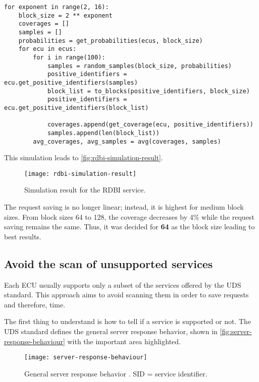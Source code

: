 \begin{samepage}
\begin{verbatim}
for exponent in range(2, 16):
    block_size = 2 ** exponent
    coverages = []
    samples = []
    probabilities = get_probabilities(ecus, block_size)
    for ecu in ecus:
        for i in range(100):
            samples = random_samples(block_size, probabilities)
            positive_identifiers = ecu.get_positive_identifiers(samples)
            block_list = to_blocks(positive_identifiers, block_size)
            positive_identifiers = ecu.get_positive_identifiers(block_list)

            coverages.append(get_coverage(ecu, positive_identifiers))
            samples.append(len(block_list))
        avg_coverages, avg_samples = avg(coverages, samples)
\end{verbatim}
\end{samepage}

This simulation leads to \autoref{fig:rdbi-simulation-result}.

\begin{figure}[h]
    \centering
    \texttt{[image: rdbi-simulation-result]}
    \caption{Simulation result for the RDBI service.}
    \label{fig:rdbi-simulation-result}
\end{figure}

The request saving is no longer linear; instead, it is highest for medium block sizes. From block sizes 64 to 128, the coverage decreases by 4\% while the request saving remains the same. Thus, it was decided for \textbf{64} as the block size leading to best results.


\subsection{Avoid the scan of unsupported services}
\label{subsec:unsupported-services-elaboration}

Each ECU usually supports only a subset of the services offered  by the UDS standard. This approach aims to avoid scanning them in order to save requests and therefore, time.

The first thing to understand is how to tell if a service is supported or not. The UDS standard defines the general server response behavior, shown in \autoref{fig:server-response-behaviour} with the important area highlighted.

\begin{figure}[h]
    \centering
    \texttt{[image: server-response-behaviour]}
    \caption{General server response behavior \cite{iso14229}. SID = service identifier.}
    \label{fig:server-response-behaviour}
\end{figure}

